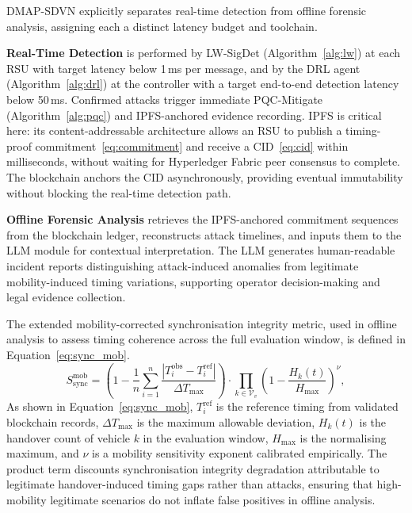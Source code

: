 DMAP-SDVN explicitly separates real-time detection from offline
forensic analysis, assigning each a distinct latency budget and
toolchain.

\textbf{Real-Time Detection} is performed by LW-SigDet
(Algorithm~\ref{alg:lw}) at each RSU with target latency below
1\,ms per message, and by the DRL agent
(Algorithm~\ref{alg:drl}) at the controller with a target
end-to-end detection latency below 50\,ms. Confirmed attacks
trigger immediate PQC-Mitigate (Algorithm~\ref{alg:pqc}) and
IPFS-anchored evidence recording. IPFS is critical here: its
content-addressable architecture allows an RSU to publish a
timing-proof commitment~\eqref{eq:commitment} and receive a
CID~\eqref{eq:cid} within milliseconds, without waiting for
Hyperledger Fabric peer consensus to complete. The blockchain
anchors the CID asynchronously, providing eventual immutability
without blocking the real-time detection path.

\textbf{Offline Forensic Analysis} retrieves the IPFS-anchored
commitment sequences from the blockchain ledger, reconstructs
attack timelines, and inputs them to the LLM module for
contextual interpretation. The LLM generates human-readable
incident reports distinguishing attack-induced anomalies from
legitimate mobility-induced timing variations, supporting
operator decision-making and legal evidence collection.

The extended mobility-corrected synchronisation integrity
metric, used in offline analysis to assess timing coherence
across the full evaluation window, is defined in
Equation~\eqref{eq:sync_mob}.
\begin{equation}
S_{\mathrm{sync}}^{\mathrm{mob}} =
  \left(1 - \frac{1}{n}\sum_{i=1}^{n}
    \frac{|T_i^{\mathrm{obs}} - T_i^{\mathrm{ref}}|}
         {\Delta T_{\max}}
  \right)
  \cdot
  \prod_{k\in\mathcal{V}_v}
  \left(1 - \frac{H_k(t)}{H_{\max}}\right)^{\!\nu},
\label{eq:sync_mob}
\end{equation}
As shown in Equation~\eqref{eq:sync_mob}, $T_i^{\mathrm{ref}}$
is the reference timing from validated blockchain records,
$\Delta T_{\max}$ is the maximum allowable deviation, $H_k(t)$
is the handover count of vehicle $k$ in the evaluation window,
$H_{\max}$ is the normalising maximum, and $\nu$ is a mobility
sensitivity exponent calibrated empirically.
The product term discounts synchronisation integrity degradation
attributable to legitimate handover-induced timing gaps rather
than attacks, ensuring that high-mobility legitimate scenarios
do not inflate false positives in offline analysis.


